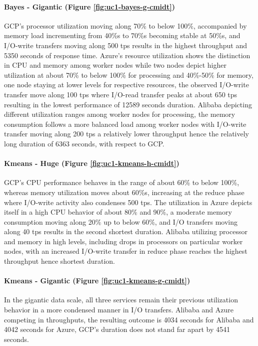 \documentclass[review]{elsarticle}
\begin{document}
\paragraph{Bayes - Gigantic (Figure \ref{fig:uc1-bayes-g-cmidt})}GCP's processor utilization moving along 70\% to below 100\%, accompanied by memory load incrementing from 40\%s to 70\%s becoming stable at 50\%s, and I/O-write transfers moving along 500 tps results in the highest throughput and 5350 seconds of response time. Azure's resource utilization shows the distinction in CPU and memory among worker nodes while two nodes depict higher utilization at about 70\% to below 100\% for processing and 40\%-50\% for memory, one node staying at lower levels for respective resources, the observed I/O-write transfer move along 100 tps where I/O-read transfer peaks at about 650 tps resulting in the lowest performance of 12589 seconds duration. Alibaba depicting different utilization ranges among worker nodes for processing, the memory consumption follows a more balanced load among worker nodes with I/O-write transfer moving along 200 tps a relatively lower throughput hence the relatively long duration of 6363 seconds, with respect to GCP.

\paragraph{Kmeans - Huge (Figure \ref{fig:uc1-kmeans-h-cmidt})}GCP's CPU performance behaves in the range of about 60\% to below 100\%, whereas memory utilization moves about 60\%s, increasing at the reduce phase where I/O-write activity also condenses 500 tps. The utilization in Azure depicts itself in a high CPU behavior of about 80\% and 90\%, a moderate memory consumption moving along 20\% up to below 60\%, and I/O transfers moving along 40 tps results in the second shortest duration. Alibaba utilizing processor and memory in high levels, including drops in processors on particular worker nodes, with an increased I/O-write transfer in reduce phase reaches the highest throughput hence shortest duration.

\paragraph{Kmeans - Gigantic (Figure \ref{fig:uc1-kmeans-g-cmidt})}In the gigantic data scale, all three services remain their previous utilization behavior in a more condensed manner in I/O transfers. Alibaba and Azure competing in throughputs, the resulting outcome is 4034 seconds for Alibaba and 4042 seconds for Azure, GCP's duration does not stand far apart by 4541 seconds.
\end{document}
